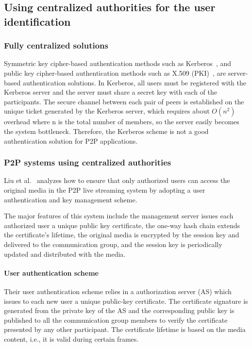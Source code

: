 \subsection{Using centralized authorities for the user identification}

\subsubsection{Fully centralized solutions}

Symmetric key cipher-based authentication methods
such as Kerberos~\cite{neuman1994kerberos}, and public key cipher-based
authentication methods such as X.509 (PKI)~\cite{solo2002internet}, are
server-based authentication solutions. In Kerberos, all
users must be registered with the Kerberos server and
the server must share a secret key with each of the participants. The secure channel between each pair of
peers is established on the unique ticket generated by
the Kerberos server, which requires about $O(n^2)$ overhead where n is the total number of members, so the
server easily becomes the system bottleneck. Therefore,
the Kerberos scheme is not a good authentication solution for P2P applications.

\subsubsection{P2P systems using centralized authorities}


Liu et al.~\cite{liu2009efficient} analyzes how to ensure that only
authorized users can access the original media in the P2P live 
streaming system by adopting a user authentication and key management scheme.

The major features of this system include the management server issues each authorized user a
unique public key certificate, the one-way hash chain extends the certificate’s lifetime, the original
media is encrypted by the session key and delivered to the communication group, and the session key is
periodically updated and distributed with the media.

\paragraph{User authentication scheme}
Their user authentication scheme relies in a
authorization server (AS) which issues to each new user a
unique public-key certificate.
The certificate signature is generated from the private
key of the AS and the corresponding public key is published to all the communication group members to verify the certificate presented by any other participant.
The certificate lifetime is based on the media content,
i.e., it is valid during certain frames. 

